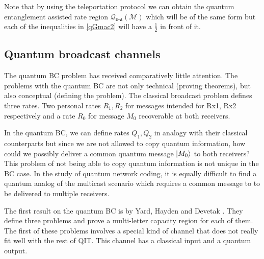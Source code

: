 \documentclass[aps,11pt,twoside,letterpaper]{article}
\newcommand{\mcal}{\mathcal}
\begin{document}
		
		Note that by using the teleportation protocol we can obtain the quantum 
		entanglement assisted rate region $\mcal{Q}_{\texttt{E-A}}(\mcal{M})$ 
		which will be of the same form but each of the inequalities in \eqref{qGmac2}
		will have a $\frac{1}{2}$ in front of it.
		
		
		
		

		

	\subsection{Quantum broadcast channels}


		The quantum BC problem has received comparatively little attention.
		The problems with the quantum BC are not only technical (proving theorems), 
		but also conceptual (defining the problem).
		The classical broadcast problem defines three rates. 
		Two personal rates  $R_1,R_2$ for messages intended for Rx1, Rx2 respectively
		and a rate $R_0$ for message $M_0$ recoverable at both receivers.

		In the quantum BC, we can define rates $Q_1,Q_2$ in analogy with their
		classical counterparts but since we are not allowed to copy quantum information,
		how could we possibly deliver a common quantum message $| M_0 \rangle$ to both receivers?
		This problem of not being able to copy quantum information is not
		unique in the BC case. 
		In the study of quantum network coding, it is equally difficult to find a 
		quantum analog of the multicast scenario which requires a common message
		to to be delivered to multiple receivers.
		
		
		The first result on the quantum BC is by Yard, Hayden and Devetak \cite{YHD2006}.
		They define three problems and prove a multi-letter capacity region for each of them.
		The first of these problems involves a special kind of channel that does not 
		really fit well with the rest of QIT. This channel has a classical input and a quantum output.
		
\end{document}
